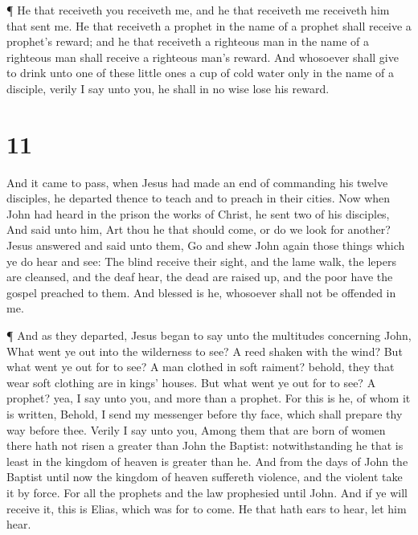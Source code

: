  ¶ He that receiveth you receiveth me, and he that
receiveth me receiveth him that sent me.  He that receiveth
a prophet in the name of a prophet shall receive a prophet's reward; and
he that receiveth a righteous man in the name of a righteous man shall
receive a righteous man's reward.  And whosoever shall give
to drink unto one of these little ones a cup of cold water only in the
name of a disciple, verily I say unto you, he shall in no wise lose his
reward.

\hypertarget{section-10}{%
\section{11}\label{section-10}}

 And it came to pass, when Jesus had made an end of
commanding his twelve disciples, he departed thence to teach and to
preach in their cities.  Now when John had heard in the
prison the works of Christ, he sent two of his disciples, 
And said unto him, Art thou he that should come, or do we look for
another?  Jesus answered and said unto them, Go and shew
John again those things which ye do hear and see:  The blind
receive their sight, and the lame walk, the lepers are cleansed, and the
deaf hear, the dead are raised up, and the poor have the gospel preached
to them.  And blessed is he, whosoever shall not be offended
in me.

 ¶ And as they departed, Jesus began to say unto the
multitudes concerning John, What went ye out into the wilderness to see?
A reed shaken with the wind?  But what went ye out for to
see? A man clothed in soft raiment? behold, they that wear soft clothing
are in kings' houses.  But what went ye out for to see? A
prophet? yea, I say unto you, and more than a prophet.  For
this is he, of whom it is written, Behold, I send my messenger before
thy face, which shall prepare thy way before thee.  Verily
I say unto you, Among them that are born of women there hath not risen a
greater than John the Baptist: notwithstanding he that is least in the
kingdom of heaven is greater than he.  And from the days of
John the Baptist until now the kingdom of heaven suffereth violence, and
the violent take it by force.  For all the prophets and the
law prophesied until John.  And if ye will receive it, this
is Elias, which was for to come.  He that hath ears to
hear, let him hear.

